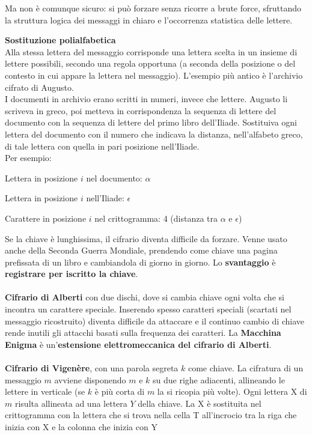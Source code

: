 \documentclass[10pt]{book}
\begin{document}
\begin{list}{}{}
Ma non è comunque sicuro: si può forzare senza ricorre a brute force, sfruttando la struttura logica dei messaggi in chiaro e l'occorrenza statistica delle lettere.
	\item \textbf{Sostituzione polialfabetica}\\
	Alla stessa lettera del messaggio corrisponde una lettera scelta in un insieme di lettere possibili, secondo una regola opportuna (a seconda della posizione o del contesto in cui appare la lettera nel messaggio). L'esempio più antico è l'archivio cifrato di Augusto.\\
	I documenti in archivio erano scritti in numeri, invece che lettere. Augusto li scriveva in greco, poi metteva in corrispondenza la sequenza di lettere del documento con la sequenza di lettere del primo libro dell'Iliade. Sostituiva ogni lettera del documento con il numero che indicava la distanza, nell'alfabeto greco, di tale lettera con quella in pari posizione nell'Iliade.\\
	Per esempio:
	\begin{list}{}{}
		\item Lettera in posizione $i$ nel documento: $\alpha$
		\item Lettera in posizione $i$ nell'Iliade: $\epsilon$
		\item Carattere in posizione $i$ nel crittogramma: 4 (distanza tra $\alpha$ e $\epsilon$)
	\end{list}
	Se la chiave è lunghissima, il cifrario diventa difficile da forzare. Venne usato anche della Seconda Guerra Mondiale, prendendo come chiave una pagina prefissata di un libro e cambiandola di giorno in giorno. Lo \textbf{svantaggio} è \textbf{registrare per iscritto la chiave}.\\\\
	\textbf{Cifrario di Alberti} con due dischi, dove si cambia chiave ogni volta che si incontra un carattere speciale. Inserendo spesso caratteri speciali (scartati nel messaggio ricostruito) diventa difficile da attaccare e il continuo cambio di chiave rende inutili gli attacchi basati sulla frequenza dei caratteri. La \textbf{Macchina Enigma} è un'\textbf{estensione elettromeccanica del cifrario di Alberti}.\\\\
	\textbf{Cifrario di Vigenère}, con una parola segreta $k$ come chiave. La cifratura di un messaggio $m$ avviene disponendo $m$ e $k$ su due righe adiacenti, allineando le lettere in verticale (se $k$ è più corta di $m$ la si ricopia più volte). Ogni lettera X di $m$ risulta allineata ad una lettera $Y$ della chiave. La X è sostituita nel crittogramma con la lettera che si trova nella cella T all'incrocio tra la riga che inizia con X  e la colonna che inizia con Y

\end{list}
\end{document}
